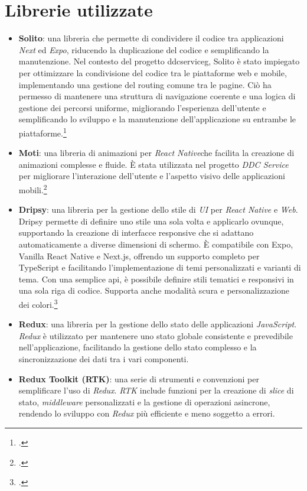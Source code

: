 \section{Librerie utilizzate}
\begin{itemize}
    \item \textbf{Solito}: una libreria che permette di condividere il codice tra applicazioni \textit{Next} ed \textit{Expo}, riducendo la duplicazione del codice e semplificando la manutenzione.
    Nel contesto del progetto \gls{ddcserviceg}\glox, Solito è stato impiegato per ottimizzare la condivisione del codice tra le piattaforme web e mobile, implementando una gestione del routing comune tra le pagine.
    Ciò ha permesso di mantenere una struttura di navigazione coerente e una logica di gestione dei percorsi uniforme, migliorando l'esperienza dell'utente e semplificando lo sviluppo e la manutenzione dell'applicazione su entrambe le piattaforme.\footcite{site:solito}
    \item \textbf{Moti}: una libreria di animazioni per \textit{React Native}\glox che facilita la creazione di animazioni complesse e fluide.
    È stata utilizzata nel progetto \textit{DDC Service} per migliorare l'interazione dell'utente e l'aspetto visivo delle applicazioni mobili.\footcite{site:moti}
    \item \textbf{Dripsy}: una libreria per la gestione dello stile di \textit{UI} per \textit{React Native} e \textit{Web}.
    Dripsy permette di definire uno stile una sola volta e applicarlo ovunque, supportando la creazione di interfacce responsive che si adattano automaticamente a diverse dimensioni di schermo. È compatibile con Expo, Vanilla React Native e Next.js, offrendo un supporto completo per TypeScript e facilitando l'implementazione di temi personalizzati e varianti di tema. Con una semplice \gls{api}\glox, è possibile definire stili tematici e responsivi in una sola riga di codice. Supporta anche modalità scura e personalizzazione dei colori.\footcite{site:dripsy}
    \item \textbf{Redux}: una libreria per la gestione dello stato delle applicazioni \textit{JavaScript}.
    \textit{Redux} è utilizzato per mantenere uno stato globale consistente e prevedibile nell'applicazione, facilitando la gestione dello stato complesso e la sincronizzazione dei dati tra i vari componenti.
    \item \textbf{Redux Toolkit (RTK)}: una serie di strumenti e convenzioni per semplificare l'uso di \textit{Redux}. \textit{RTK} include funzioni per la creazione di \textit{slice} di stato, \textit{middleware} personalizzati e la gestione di operazioni asincrone, rendendo lo sviluppo con \textit{Redux} più efficiente e meno soggetto a errori.

\end{itemize}
